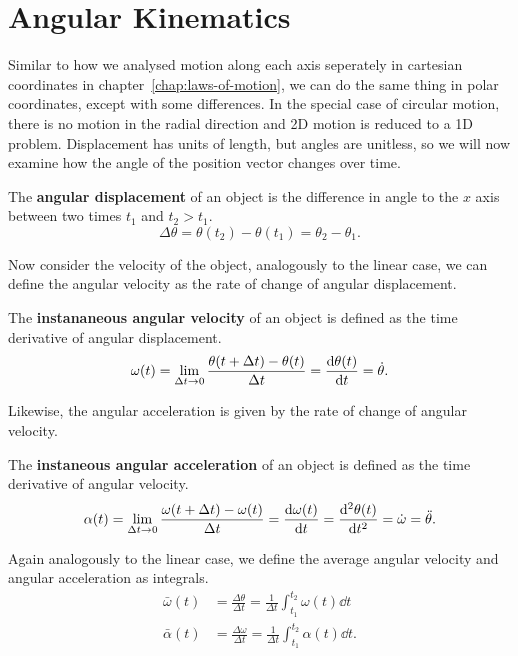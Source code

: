 \documentclass[../classical_mechanics.tex]{subfiles}
\begin{document}
    \section{Angular Kinematics}\label{sec:angular-kinematics}
        Similar to how we analysed motion along each axis seperately in cartesian coordinates in chapter~\ref{chap:laws-of-motion}, we can do the same thing in polar coordinates, except with some differences.
        In the special case of circular motion, there is no motion in the radial direction and 2D motion is reduced to a 1D problem.
        Displacement has units of length, but angles are unitless, so we will now examine how the angle of the position vector changes over time.
        \begin{definition}
            The \textbf{angular displacement} of an object is the difference in angle to the $x$ axis between two times $t_1$ and $t_2>t_1$.
            \begin{equation}
                \Delta\theta=\theta(t_2)-\theta(t_1)=\theta_2-\theta_1.
            \end{equation}
        \end{definition}
        Now consider the velocity of the object, analogously to the linear case, we can define the angular velocity as the rate of change of angular displacement.
        \begin{definition}
            The \textbf{instananeous angular velocity} of an object is defined as the time derivative of angular displacement.
            \begin{equation}
                \omega(t)=\lim_{\Delta t\to0}\frac{\theta(t+\Delta t)-\theta(t)}{\Delta t}=\dv{\theta(t)}{t}=\dot{\theta}.
            \end{equation}
        \end{definition}
        Likewise, the angular acceleration is given by the rate of change of angular velocity.
        \begin{definition}
            The \textbf{instaneous angular acceleration} of an object is defined as the time derivative of angular velocity.
            \begin{equation}
                \alpha(t)=\lim_{\Delta t\to0}\frac{\omega(t+\Delta t)-\omega(t)}{\Delta t}=\dv{\omega(t)}{t}=\dv[2]{\theta(t)}{t}=\dot{\omega}=\ddot{\theta}.
            \end{equation}
        \end{definition}
        Again analogously to the linear case, we define the average angular velocity and angular acceleration as integrals.
        \begin{align}
            \bar{\omega}(t)&=\frac{\Delta\theta}{\Delta t}=\frac{1}{\Delta t}\int_{t_1}^{t_2}\omega(t)\dd{t}\\
            \bar{\alpha}(t)&=\frac{\Delta\omega}{\Delta t}=\frac{1}{\Delta t}\int_{t_1}^{t_2}\alpha(t)\dd{t}.
        \end{align}
\end{document}
